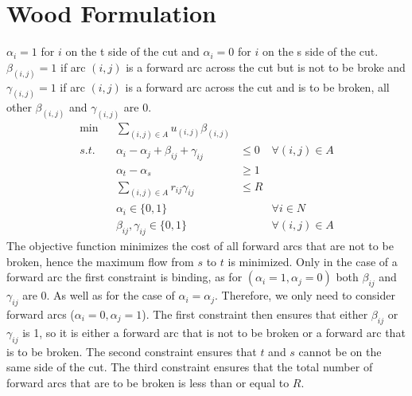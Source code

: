 \documentclass{article}
\begin{document}
\section{Wood Formulation}
$\alpha_i = 1$ for $i$ on the t side of the cut and $\alpha_i = 0$ for $i$ on the s side of the cut. $\beta_{(i,j)} = 1$ if arc $(i,j)$ is a forward arc across the cut but is not to be broke and $\gamma_{(i,j)} = 1$ if arc $(i,j)$ is a forward arc across the cut and is to be broken, all other $\beta_{(i,j)}$ and $\gamma_{(i,j)}$ are 0.  
\begin{align*}
     \min &  & \sum_{(i,j) \in A} u_{(i,j)}\beta_{(i,j)}                                      \\
     s.t. &  & \alpha_i - \alpha_j + \beta_{ij} + \gamma_{ij} & \leq 0 & \forall (i,j) \in A  \\
          &  & \alpha_{t} - \alpha_{s}                        & \geq 1 &                      \\
          &  & \sum_{(i,j) \in A} r_{ij}\gamma_{ij}           & \leq R &                      \\
          &  & \alpha_i \in \{0,1\}                           &        & \forall i \in N      \\
          &  & \beta_{ij}, \gamma_{ij} \in \{0,1\}            &        & \forall (i,j) \in A
\end{align*}
The objective function minimizes the cost of all forward arcs that are not to be broken, hence the maximum flow from $s$ to $t$ is minimized. Only in the case of a forward arc the first constraint is binding, as for $(\alpha_i = 1, \alpha_j = 0)$ both $\beta_{ij}$ and $\gamma_{ij}$ are 0. As well as for the case of $\alpha_i = \alpha_j$. Therefore, we only need to consider forward arcs ($\alpha_i = 0, \alpha_j = 1$). The first constraint then ensures that either $\beta_{ij}$ or $\gamma_{ij}$ is 1, so it is either a forward arc that is not to be broken or a forward arc that is to be broken. The second constraint ensures that $t$ and $s$ cannot be on the same side of the cut. The third constraint ensures that the total number of forward arcs that are to be broken is less than or equal to $R$.
\end{document}
